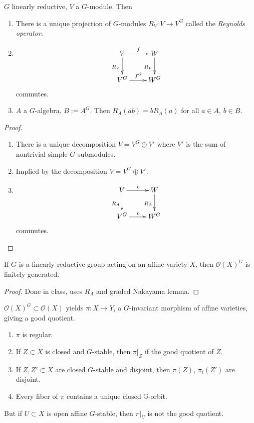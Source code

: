 \begin{lemma}
\label{lemma-Reynolds-operator}
$G$ linearly reductive, $V$ a $G$-module. Then
\begin{enumerate}
\item There is a unique projection of $G$-modules $R_V:V \to V^G$ called the
{\it Reynolds operator}.
\item 
$$
\xymatrix{
V\ar[d]_{R_V}\ar[r]^f&  W\ar[d]_{R_V}\\
V^G\ar[r]^{f^G}&W^G
}
$$
commutes.
\item $A$ a $G$-algebra, $B:=A^G$. Then $R_A(ab)=bR_A(a)$ for all $a \in A$, $b
\in B$.
\end{enumerate}
\end{lemma}

\begin{proof}
\begin{enumerate}
\item There is a unique decomposition $V=V^G \oplus V'$ where $V'$ is the sum of
nontrivial simple $G$-submodules.
\item Implied by the decomposition $V=V^G \oplus V'$.
\item 
$$
\xymatrix{
V\ar[d]_{R_A}\ar[r]^b&  W\ar[d]_{R_A}\\
V^G\ar[r]^{b}&W^G
}
$$
commutes.
\end{enumerate}
\end{proof}

\begin{theorem}
\label{theorem-linearly-reductive-action-
implies-invariant-sections-finitely-generated}
If $G$ is a linearly reductive group acting on an affine variety $X$, then
$\mathcal{O}(X)^G$ is finitely generated.
\end{theorem}

\begin{proof}
Done in class, uses $R_A$ and graded Nakayama lemma.
\end{proof}

\medskip\noindent	
$\mathcal{O}(X)^G \subset \mathcal{O}(X)$ yields $\pi:X\to Y$, a $G$-invariant
morphism of affine varieties, giving a good quotient.

\begin{proposition}
\label{proposition-projection}
\begin{enumerate}
\item $\pi$ is regular.
\item If  $Z \subset X$ is closed and $G$-stable, then $\pi|_{Z}$ if the good
quotient of $Z$.
\item If $Z,Z'\subset X$ are closed $G$-stable and disjoint, then $\pi(Z)$,
$\pi_i(Z')$ are disjoint.
\item Every fiber of $\pi$ contains a unique closed $\mathbb{G}$-orbit.
\end{enumerate}
But if $U\subset X$ is open affine $G$-stable, then $\pi|_{U}$ is not the good
quotient.
\end{proposition}

